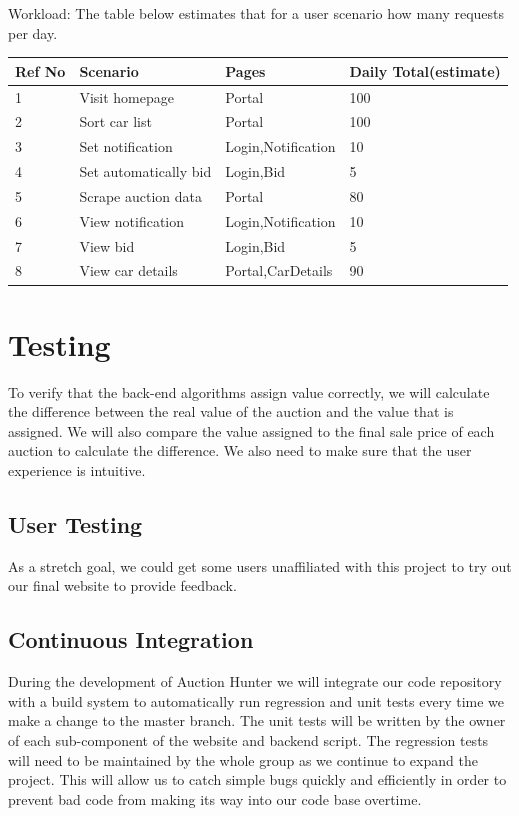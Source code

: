 \documentclass[draftclsnofoot,onecolumn,10pt]{IEEEtran}
\begin{document}
\begin{center}
Workload: The table below estimates that for a user scenario how many requests per day.\\
\begin{tabular}{ | m{2cm} | m{4cm}| m{3cm} | m{3cm} | } 
\hline
Ref No & Scenario & Pages & Daily Total(estimate) \\ \hline
1 &Visit homepage   &Portal  &100\\  
\hline
2 &Sort car list  &Portal  &100\\
\hline
3 &Set notification  &Login,Notification  &10\\
\hline
4 &Set automatically bid  &Login,Bid  &5\\
\hline
5 &Scrape auction data  &Portal  &80\\
\hline
6 &View notification  &Login,Notification  &10\\
\hline
7 &View bid  &Login,Bid  &5\\
\hline
8 &View car details  &Portal,CarDetails &90\\
\hline
\end{tabular}
\end{center}

\section{Testing}
To verify that the back-end algorithms assign value correctly, we will calculate the difference between the real value of the auction and the value that is assigned. We will also compare the value assigned to the final sale price of each auction to calculate the difference. We also need to make sure that the user experience is intuitive.

\subsection{User Testing}
As a stretch goal, we could get some users unaffiliated with this project to try out our final website to provide feedback. 

\subsection{Continuous Integration}
During the development of Auction Hunter we will integrate our code repository with a build system to automatically run regression and unit tests every time we make a change to the master branch. The unit tests will be written by the owner of each sub-component of the website and backend script. The regression tests will need to be maintained by the whole group as we continue to expand the project. This will allow us to catch simple bugs quickly and efficiently in order to prevent bad code from making its way into our code base overtime. 
\end{document}
